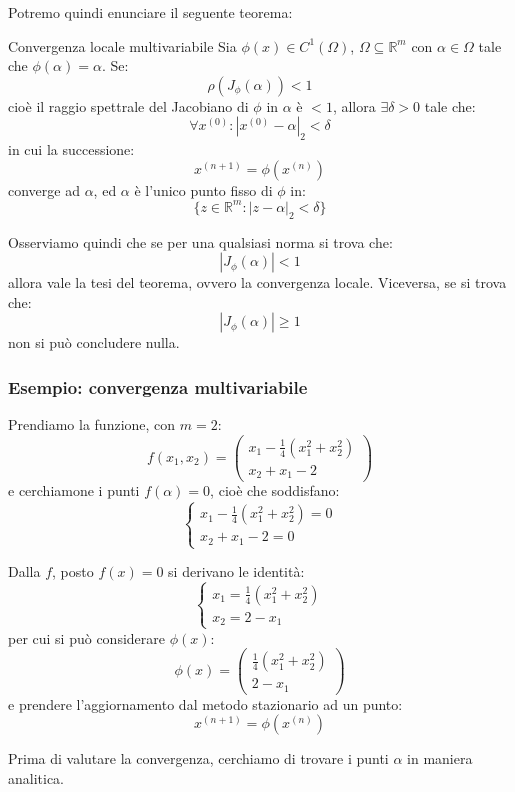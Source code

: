 \documentclass[a4paper,11pt]{article}
\begin{document}
Potremo quindi enunciare il seguente teorema:
\begin{theorem}{Convergenza locale multivariabile}
	Sia $\phi(x) \in C^1(\Omega)$, $\Omega \subseteq \mathbb{R}^m$ con $\alpha \in \Omega$ tale che $\phi(\alpha) = \alpha$.
	Se:
	$$
	\rho\left(J_\phi (\alpha) \right) < 1
	$$
	cioè il raggio spettrale del Jacobiano di $\phi$ in $\alpha$ è $< 1$, allora $\exists \delta > 0$ tale che:
	$$
	\forall x^{(0)} : |x^{(0)} - \alpha|_2 < \delta
	$$
	in cui la successione:
	$$
	x^{(n + 1)} = \phi(x^{(n)})
	$$
	converge ad $\alpha$, ed $\alpha$ è l'unico punto fisso di $\phi$ in:
	$$
	\{ z \in \mathbb{R}^m : |z - \alpha|_2 < \delta \}
	$$
\end{theorem}

Osserviamo quindi che se per una qualsiasi norma si trova che:
$$
| J_\phi(\alpha) | < 1
$$
allora vale la tesi del teorema, ovvero la convergenza locale.
Viceversa, se si trova che:
$$
| J_\phi(\alpha) | \geq 1
$$
non si può concludere nulla.

\subsubsection{Esempio: convergenza multivariabile}
Prendiamo la funzione, con $m = 2$:
$$
f(x_1, x_2) = 
\begin{pmatrix}
	x_1 - \frac{1}{4} (x_1^2 + x_2^2) \\
	x_2 + x_1 - 2
\end{pmatrix}
$$
e cerchiamone i punti $f(\alpha) = 0$, cioè che soddisfano:
\[
	\begin{cases}
		x_1 - \frac{1}{4} (x_1^2 + x_2^2) = 0 \\
		x_2 + x_1 - 2 = 0
	\end{cases}
\]

Dalla $f$, posto $f(x) = 0$ si derivano le identità:
\[
	\begin{cases}
		x_1 = \frac{1}{4} (x_1^2 + x_2^2)	\\
		x_2 = 2 - x_1
	\end{cases}
\]
per cui si può considerare $\phi(x)$:
$$
\phi(x) =
\begin{pmatrix}
	\frac{1}{4} (x_1^2 + x_2^2) \\
	2 - x_1
\end{pmatrix}
$$
e 
prendere l'aggiornamento dal metodo stazionario ad un punto:
$$
x^{(n + 1)} = \phi(x^{(n)})
$$

\par\smallskip

Prima di valutare la convergenza, cerchiamo di trovare i punti $\alpha$ in maniera analitica.
\end{document}
